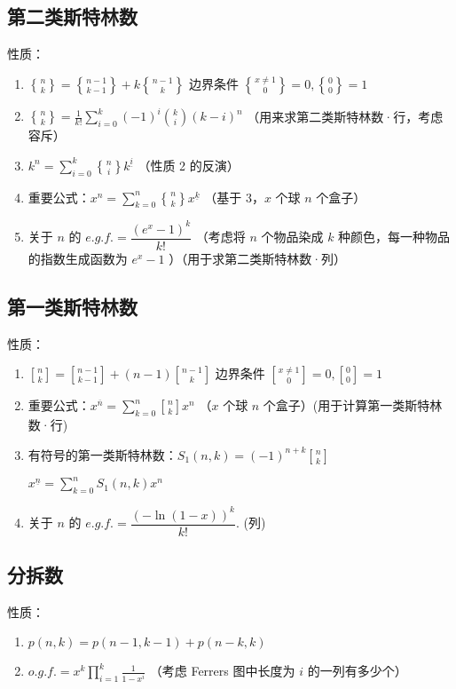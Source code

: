 \subsection{第二类斯特林数}

性质：
\begin{enumerate}
    \item ${n\brace k}={n-1\brace k-1}+k{n-1\brace k}$ 边界条件 ${x\neq 1\brace 0}=0,{0\brace 0}=1$
    \item ${n\brace k}=\frac{1}{k!}\sum\limits_{i=0}^{k}(-1)^i\binom{k}{i}(k-i)^{n}$ （用来求第二类斯特林数·行，考虑容斥）
    \item $k^n=\sum\limits_{i=0}^k {n\brace i} k^{\underline{i}}$ （性质 2 的反演）
    \item 重要公式：$x^n=\sum\limits_{k=0}^{n}{n\brace k}x^{\underline k}$ （基于 3，$x$ 个球 $n$ 个盒子）
    \item 关于 $n$ 的 $e.g.f.=\dfrac{(e^x-1)^k}{k!}$ （考虑将 $n$ 个物品染成 $k$ 种颜色，每一种物品的指数生成函数为 $e^x-1$ ）（用于求第二类斯特林数·列）
\end{enumerate}

\subsection{第一类斯特林数}

性质：
\begin{enumerate}
    \item ${n\brack k}={n-1\brack k-1}+(n-1){n-1\brack k}$ 边界条件 ${x\neq1\brack 0}=0,{0\brack 0}=1$
    \item 重要公式：$x^{\overline n}=\sum\limits_{k=0}^{n}{n\brack k}x^n$ （$x$ 个球 $n$ 个盒子）(用于计算第一类斯特林数·行)
    \item 有符号的第一类斯特林数：$S_1(n,k)=(-1)^{n+k}{n\brack k}$
    
    $x^{\underline n}=\sum\limits_{k=0}^{n}S_1(n,k)x^n$
    \item 关于 $n$ 的 $e.g.f.=\dfrac{(-\ln(1-x))^k}{k!}$. (列)
\end{enumerate}

\subsection{分拆数}

性质：
\begin{enumerate}
    \item $p(n,k)=p(n-1,k-1)+p(n-k,k)$
    \item $o.g.f. = x^k \prod\limits_{i=1}^k \frac{1}{1-x^i}$ （考虑 Ferrers 图中长度为 $i$ 的一列有多少个）
\end{enumerate}

